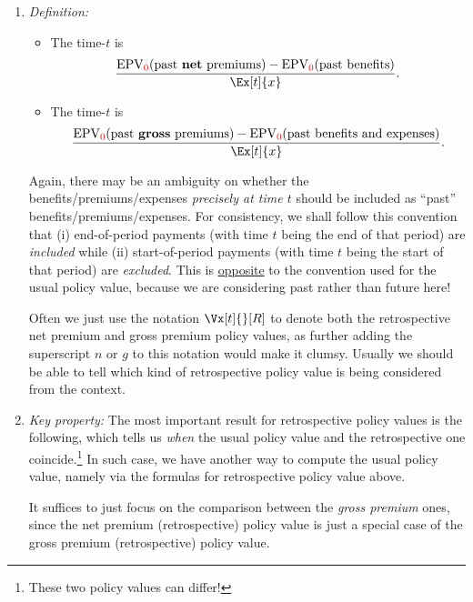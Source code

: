 \begin{enumerate}
\begin{enumerate}[label={(\arabic*)}]
\item \emph{Definition:}
\begin{itemize}
\item The time-\(t\)  is
\[
\frac{\epvt{\rc{0}}{\text{past \textbf{net} premiums}}-\epvt{\rc{0}}{\text{past benefits}}}{\Ex[t]{x}}.
\]
\item The time-\(t\)  is
\[
\frac{\epvt{\rc{0}}{\text{past \textbf{gross} premiums}}-\epvt{\rc{0}}{\text{past benefits and expenses}}}{\Ex[t]{x}}.
\]
\end{itemize}
\begin{warning}
Again, there may be an ambiguity on whether the benefits/premiums/expenses
\emph{precisely at time \(t\)} should be included as ``past''
benefits/premiums/expenses. For consistency, we shall follow this convention
that (i) end-of-period payments (with time \(t\) being the end of that period)
are \emph{included} while (ii) start-of-period payments (with time \(t\) being
the start of that period) are \emph{excluded}. This is \underline{opposite} to
the convention used for the usual policy value, because we are considering past
rather than future here!
\end{warning}

\begin{note}
Often we just use the notation \(\Vx[t]{}[R]\) to denote both the retrospective
net premium and gross premium policy values, as further adding the superscript
\(n\) or \(g\) to this notation would make it clumsy. Usually we should be able
to tell which kind of retrospective policy value is being considered from the
context.
\end{note}
\item \emph{Key property:} The most important result for retrospective policy
values is the following, which tells us \emph{when} the usual policy value and
the retrospective one coincide.\footnote{These two policy values can
differ!} In such case, we have another way to compute the usual policy value,
namely via the formulas for retrospective policy value above.

It suffices to just focus on the comparison between the \emph{gross premium}
ones, since the net premium (retrospective) policy value is just a special case
of the gross premium (retrospective) policy value.


\end{enumerate}
\end{enumerate}
